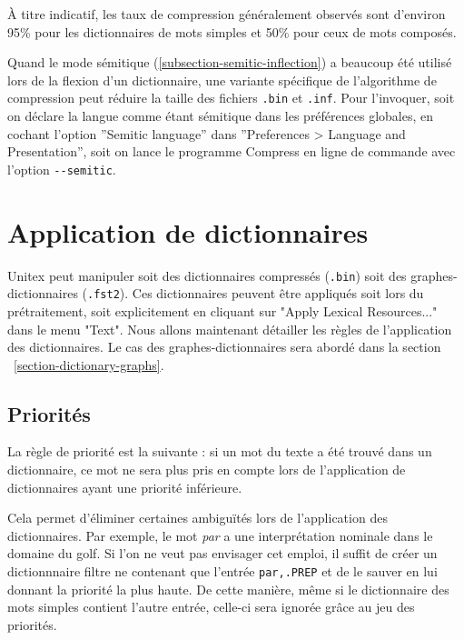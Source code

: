 \bigskip
\noindent À titre indicatif, les taux de compression généralement observés sont d’environ 95\% pour
les dictionnaires de mots simples et 50\% pour ceux de mots composés.


\bigskip
\noindent Quand le mode sémitique (\ref{subsection-semitic-inflection}) a beaucoup été utilisé lors de la flexion
d'un dictionnaire, une variante spécifique de l'algorithme de compression peut réduire la taille des fichiers
\verb+.bin+ et \verb+.inf+. Pour l'invoquer, soit on déclare la langue comme étant sémitique dans les préférences
globales, en cochant l'option ''Semitic language'' dans ''Preferences > Language and Presentation'', soit on
lance le programme Compress en ligne de commande avec l'option \verb+--semitic+.


\section{Application de dictionnaires}
\label{section-applying-dictionaries}

\bigskip
\noindent Unitex peut manipuler soit des dictionnaires compressés (\verb+.bin+) soit des graphes-dictionnaires (\verb+.fst2+). Ces dictionnaires peuvent être appliqués soit lors du prétraitement,
soit explicitement en cliquant sur "Apply Lexical Resources..." dans le menu "Text". Nous allons
maintenant détailler les règles de l’application des dictionnaires. Le cas des graphes-dictionnaires
sera abordé dans la section ~\ref{section-dictionary-graphs}.

\subsection{Priorités}
\label{section-dictionary-priorities}
La règle de priorité est la suivante : si un mot du texte a été trouvé dans un dictionnaire,
ce mot ne sera plus pris en compte lors de l’application de dictionnaires ayant une priorité
inférieure.


\bigskip
\noindent Cela permet d’éliminer certaines ambiguïtés lors de l’application des dictionnaires.
Par exemple, le mot \textit{par} a une interprétation nominale dans le domaine du golf. Si l’on ne
veut pas envisager cet emploi, il suffit de créer un dictionnnaire filtre ne contenant que l’entrée 
\verb$par,.PREP$ et de le sauver en lui donnant la priorité la plus haute. De cette manière, même
si le dictionnaire des mots simples contient l’autre entrée, celle-ci sera ignorée grâce au jeu
des priorités.

